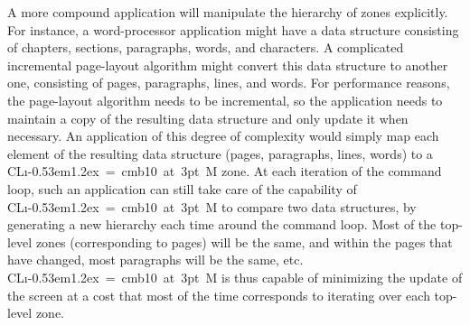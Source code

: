 \documentclass{report}
\def\Tiny{ \font\Tinyfont = cmb10 at 3pt \relax  \Tinyfont}
\def\clim{\textsf{CL{\i}\kern-0.53em\raise1.2ex\hbox{\Tiny 3}M}}
\begin{document}
A more compound application will manipulate the hierarchy of zones
explicitly.  For instance, a word-processor application might have a
data structure consisting of chapters, sections, paragraphs, words,
and characters.  A complicated incremental page-layout algorithm might
convert this data structure to another one, consisting of pages,
paragraphs, lines, and words.  For performance reasons, the
page-layout algorithm needs to be incremental, so the application
needs to maintain a copy of the resulting data structure and only
update it when necessary.  An application of this degree of complexity
would simply map each element of the resulting data structure (pages,
paragraphs, lines, words) to a \clim{} zone.  At each iteration of
the command loop, such an application can still take care of the
capability of \clim{} to compare two data structures, by generating a
new hierarchy each time around the command loop.  Most of the
top-level zones (corresponding to pages) will be the same, and
within the pages that have changed, most paragraphs will be the same,
etc.  \clim{} is thus capable of minimizing the update of the screen at
a cost that most of the time corresponds to iterating over each
top-level zone. 
\end{document}

